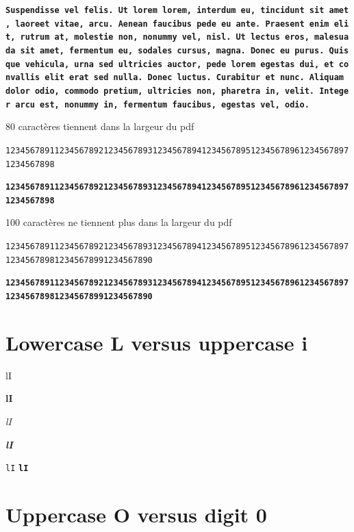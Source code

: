 \documentclass[twoside]{extreport}
\begin{document}
\textbf{\texttt{Suspendisse\ vel\ felis.\ Ut\ lorem\ lorem,\ interdum\ eu,\ tincidunt\ sit\ amet,\ laoreet\ vitae,\ arcu.\ Aenean\ faucibus\ pede\ eu\ ante.\ Praesent\ enim\ elit,\ rutrum\ at,\ molestie\ non,\ nonummy\ vel,\ nisl.\ Ut\ lectus\ eros,\ malesuada\ sit\ amet,\ fermentum\ eu,\ sodales\ cursus,\ magna.\ Donec\ eu\ purus.\ Quisque\ vehicula,\ urna\ sed\ ultricies\ auctor,\ pede\ lorem\ egestas\ dui,\ et\ convallis\ elit\ erat\ sed\ nulla.\ Donec\ luctus.\ Curabitur\ et\ nunc.\ Aliquam\ dolor\ odio,\ commodo\ pretium,\ ultricies\ non,\ pharetra\ in,\ velit.\ Integer\ arcu\ est,\ nonummy\ in,\ fermentum\ faucibus,\ egestas\ vel,\ odio.}}

80 caractères tiennent dans la largeur du pdf

\texttt{12345678911234567892123456789312345678941234567895123456789612345678971234567898}

\textbf{\texttt{12345678911234567892123456789312345678941234567895123456789612345678971234567898}}

100 caractères ne tiennent plus dans la largeur du pdf

\texttt{1234567891123456789212345678931234567894123456789512345678961234567897123456789812345678991234567890}

\textbf{\texttt{1234567891123456789212345678931234567894123456789512345678961234567897123456789812345678991234567890}}

\hypertarget{lowercase-l-versus-uppercase-i}{%
\section{Lowercase L versus uppercase
i}\label{lowercase-l-versus-uppercase-i}}

\begin{description}
\tightlist
\item[normal:]
lI
\item[bold:]
\textbf{lI}
\item[italics:]
\emph{lI}
\item[bold italics:]
\textbf{\emph{lI}}
\item[fixed width:]
\texttt{lI} \textbf{\texttt{lI}}
\end{description}

\hypertarget{uppercase-o-versus-digit-0}{%
\section{Uppercase O versus digit 0}\label{uppercase-o-versus-digit-0}}
\end{document}

